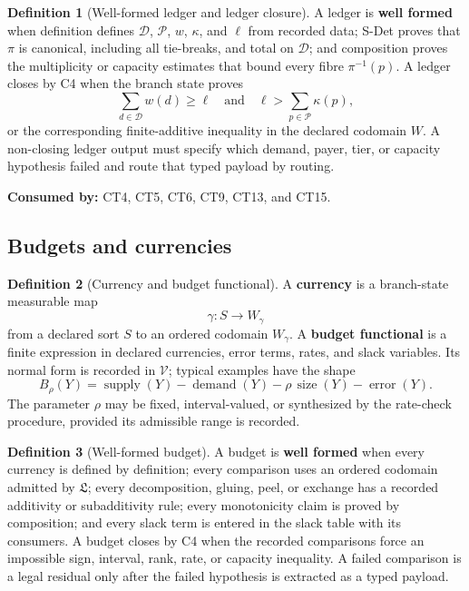 \documentclass[
  11pt,
]{article}
\theoremstyle{definition}
\newtheorem{definition}{Definition}[section]
\begin{document}
\begin{definition}[Well-formed ledger and ledger closure]\label{def:ledger-closure}
A ledger is \textbf{well formed} when definition defines
\(\mathcal D\), \(\mathcal P\), \(w\), \(\kappa\), and \(\ell\) from
recorded data; S-Det proves that \(\pi\) is canonical, including all
tie-breaks, and total on \(\mathcal D\); and composition proves the
multiplicity or capacity estimates that bound every fibre
\(\pi^{-1}(p)\).  A ledger closes by C4 when the
branch state proves
\[
\sum_{d\in\mathcal D} w(d)\ge \ell
\quad\text{and}\quad
\ell>\sum_{p\in\mathcal P}\kappa(p),
\]
or the corresponding finite-additive inequality in the declared
codomain \(W\).  A non-closing ledger output must specify which demand,
payer, tier, or capacity hypothesis failed and route that typed payload
by routing.
\end{definition}

\noindent\textbf{Consumed by:} CT4, CT5, CT6, CT9, CT13, and CT15.

\subsection{Budgets and currencies}\label{data-budgets}
\begin{definition}[Currency and budget functional]\label{def:budget-functional}
A \textbf{currency} is a branch-state measurable map
\[
\gamma:S\longrightarrow W_\gamma
\]
from a declared sort \(S\) to an ordered codomain \(W_\gamma\).  A
\textbf{budget functional} is a finite expression in declared
currencies, error terms, rates, and slack variables.  Its normal form is
recorded in \(\mathcal V\); typical examples have the shape
\[
B_\rho(Y)
=\operatorname{supply}(Y)-\operatorname{demand}(Y)-\rho\,\operatorname{size}(Y)
-\operatorname{error}(Y).
\]
The parameter \(\rho\) may be fixed, interval-valued, or synthesized by
the rate-check procedure, provided its admissible range is recorded.
\end{definition}

\begin{definition}[Well-formed budget]\label{def:well-formed-budget}
A budget is \textbf{well formed} when every currency is defined by
definition; every comparison uses an ordered codomain admitted by
\(\mathfrak L\); every decomposition, gluing, peel, or exchange has a
recorded additivity or subadditivity rule; every monotonicity claim is
proved by composition; and every slack term is entered in the slack table
with its consumers.  A budget closes by C4 when the recorded
comparisons force an impossible sign, interval, rank, rate, or capacity
inequality.  A failed comparison is a legal residual only after the
failed hypothesis is extracted as a typed payload.
\end{definition}
\end{document}
